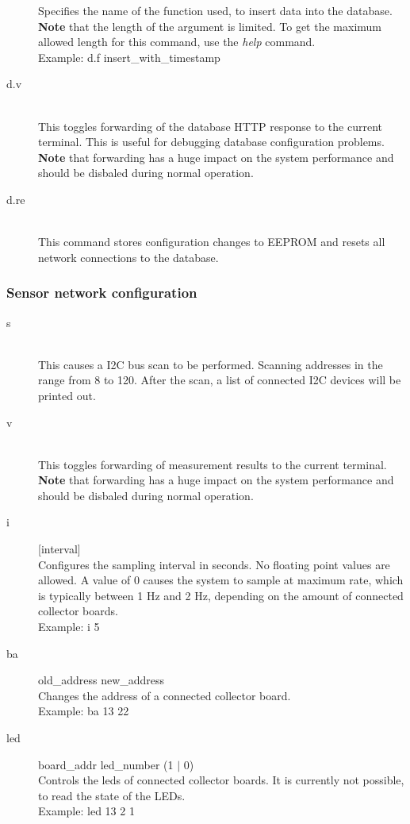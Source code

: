 \documentclass[a4paper]{scrreprt}
\begin{document}
\begin{description}
    Specifies the name of the function used, to insert data into the database.\\
    \textbf{Note} that the length of the argument is limited. To get the maximum allowed
    length for this command, use the \emph{help} command.\\
    Example: d.f insert\_with\_timestamp
  \item[d.v]\hspace{1cm}\\
    This toggles forwarding of the database HTTP response to the current terminal.
    This is useful for debugging database configuration problems.\\
    \textbf{Note} that forwarding has a huge impact on the system performance and should be
    disbaled during normal operation.
  \item[d.re]\hspace{1cm}\\
    This command stores configuration changes to EEPROM and resets all network
    connections to the database.
\end{description}
\subsubsection{Sensor network configuration}
\begin{description}
  \item[s] \hspace{1cm}\\
    This causes a I2C bus scan to be performed. Scanning addresses in the range from
    8 to 120. After the scan, a list of connected I2C devices will be printed out.
  \item[v] \hspace{1cm}\\
    This toggles forwarding of measurement results to the current terminal.\\
    \textbf{Note} that forwarding has a huge impact on the system performance and should be
    disbaled during normal operation.
  \item[i] [interval]\\
    Configures the sampling interval in seconds. No floating point values are allowed.
    A value of 0 causes the system to sample at maximum rate, which is typically
    between 1 Hz and 2 Hz, depending on the amount of connected collector boards.\\
    Example: i 5
  \item[ba] old\_address new\_address\\
    Changes the address of a connected collector board.\\
    Example: ba 13 22
  \item[led] board\_addr led\_number (1 $|$ 0)\\
    Controls the leds of connected collector boards. It is currently not possible, to read the state of the LEDs.\\
    Example: led 13 2 1
\end{description}
\end{document}
